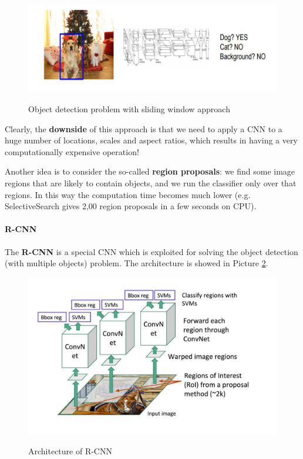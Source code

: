 \begin{figure}[h!]
		\centering
        \includegraphics[scale = 0.35]{img/object detection3.jpeg}
		\label{object detection 3}
        \caption{Object detection problem with sliding window approach}
\end{figure}

Clearly, the \textbf{downside} of this approach is that we need to apply a CNN to a huge number of locations, scales and aspect ratios, which results in having a very computationally expensive operation!

Another idea is to consider the so-called \textbf{region proposals}: we find some image regions that are likely to contain objects, and we run the classifier only over that regions. In this way the computation time becomes much lower (e.g. SelectiveSearch gives 2,00 region proposals in a few seconds on CPU).

\paragraph{R-CNN}

The \textbf{R-CNN} is a special CNN which is exploited for solving the object detection (with multiple objects) problem. The architecture is showed in Picture \ref{r-cnn}.

\begin{figure}[h!]
		\centering
        \includegraphics[scale = 0.50]{img/r-cnn.jpg}
		\label{r-cnn}
        \caption{Architecture of R-CNN}
\end{figure}

